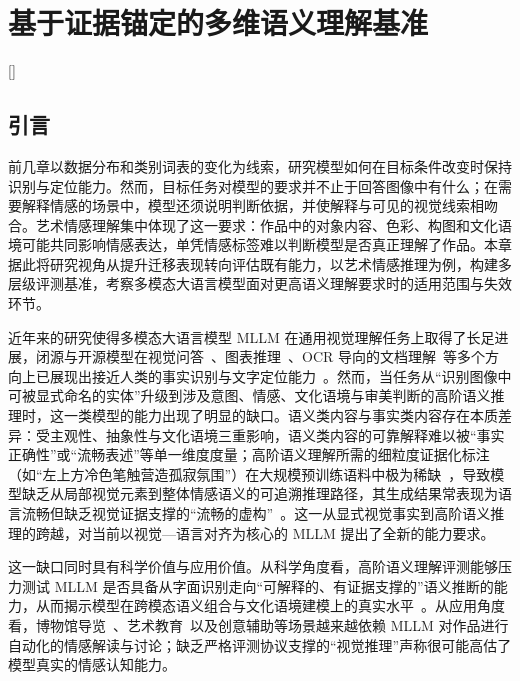 
\chapter[基于证据锚定的多维语义理解基准]{基于证据锚定的多维语义理解基准}[]

\label{chap:5}
\setcounter{footnote}{0}
\renewcommand{\thefootnote}{\arabic{footnote}}


\section{引言}

前几章以数据分布和类别词表的变化为线索，研究模型如何在目标条件改变时保持识别与定位能力。然而，目标任务对模型的要求并不止于回答图像中有什么；在需要解释情感的场景中，模型还须说明判断依据，并使解释与可见的视觉线索相吻合。艺术情感理解集中体现了这一要求：作品中的对象内容、色彩、构图和文化语境可能共同影响情感表达，单凭情感标签难以判断模型是否真正理解了作品。本章据此将研究视角从提升迁移表现转向评估既有能力，以艺术情感推理为例，构建多层级评测基准，考察多模态大语言模型面对更高语义理解要求时的适用范围与失效环节。

近年来的研究使得多模态大语言模型 MLLM 在通用视觉理解任务上取得了长足进展，闭源与开源模型在视觉问答~\cite{kuang2025natural,tang2025mtvqa}、图表推理~\cite{masry2025chartgemma}、OCR 导向的文档理解~\cite{yang2025cc,ye2023mplug}等多个方向上已展现出接近人类的事实识别与文字定位能力~\cite{mmbench2023}。然而，当任务从“识别图像中可被显式命名的实体”升级到涉及意图、情感、文化语境与审美判断的高阶语义推理时，这一类模型的能力出现了明显的缺口。语义类内容与事实类内容存在本质差异：受主观性、抽象性与文化语境三重影响，语义类内容的可靠解释难以被“事实正确性”或“流畅表述”等单一维度度量；高阶语义理解所需的细粒度证据化标注（如“左上方冷色笔触营造孤寂氛围”）在大规模预训练语料中极为稀缺~\cite{aesexpert2024}，导致模型缺乏从局部视觉元素到整体情感语义的可追溯推理路径，其生成结果常表现为语言流畅但缺乏视觉证据支撑的“流畅的虚构”~\cite{eemobench2025}。这一从显式视觉事实到高阶语义推理的跨越，对当前以视觉—语言对齐为核心的 MLLM 提出了全新的能力要求。

这一缺口同时具有科学价值与应用价值。从科学角度看，高阶语义理解评测能够压力测试 MLLM 是否具备从字面识别走向“可解释的、有证据支撑的”语义推断的能力，从而揭示模型在跨模态语义组合与文化语境建模上的真实水平~\cite{liu2025emer}。从应用角度看，博物馆导览~\cite{Balauca_2025_ICCV}、艺术教育~\cite{LEE2024100297}以及创意辅助等场景越来越依赖 MLLM 对作品进行自动化的情感解读与讨论；缺乏严格评测协议支撑的“视觉推理”声称很可能高估了模型真实的情感认知能力。

